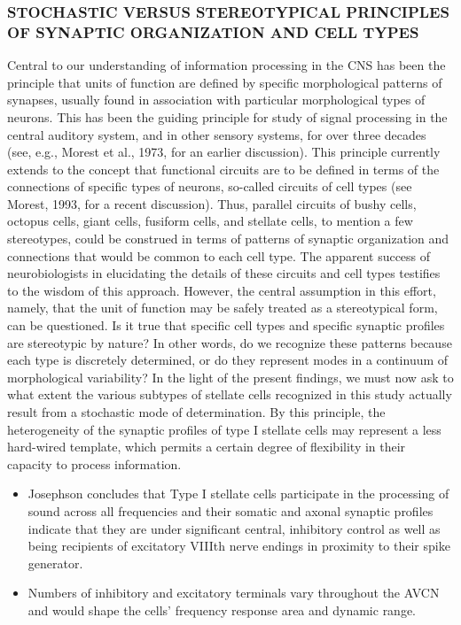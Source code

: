 \documentclass[10pt,a4paper]{article}
\begin{document}
\subsubsection{STOCHASTIC VERSUS STEREOTYPICAL PRINCIPLES OF
SYNAPTIC ORGANIZATION AND CELL TYPES}

Central to our understanding of information processing in the CNS has been the
principle that units of function are defined by specific morphological patterns
of synapses, usually found in association with particular morphological types of
neurons. This has been the guiding principle for study of signal processing in
the central auditory system, and in other sensory systems, for over three
decades (see, e.g., Morest et al., 1973, for an earlier discussion). This
principle currently extends to the concept that functional circuits are to be
defined in terms of the connections of specific types of neurons, so-called
circuits of cell types (see Morest, 1993, for a recent discussion). Thus,
parallel circuits of bushy cells, octopus cells, giant cells, fusiform cells,
and stellate cells, to mention a few stereotypes, could be construed in terms of
patterns of synaptic organization and connections that would be common to each
cell type.  The apparent success of neurobiologists in elucidating the details
of these circuits and cell types testifies to the wisdom of this approach.
However, the central assumption in this effort, namely, that the unit of
function may be safely treated as a stereotypical form, can be questioned. Is it
true that specific cell types and specific synaptic profiles are stereotypic by
nature? In other words, do we recognize these patterns because each type is
discretely determined, or do they represent modes in a continuum of
morphological variability? In the light of the present findings, we must now ask
to what extent the various subtypes of stellate cells recognized in this study
actually result from a stochastic mode of determination. By this principle, the
heterogeneity of the synaptic profiles of type I stellate cells may represent a
less hard-wired template, which permits a certain degree of flexibility in their
capacity to process information.


\begin{itemize}
\item Josephson concludes that Type I stellate cells participate in the
  processing of sound across all frequencies and their somatic and axonal
  synaptic profiles indicate that they are under significant central, inhibitory
  control as well as being recipients of excitatory VIIIth nerve endings in
  proximity to their spike generator.
\item Numbers of inhibitory and excitatory terminals vary throughout the AVCN
  and would shape the cells{\textquoteright} frequency response area and dynamic
  range.
\end{itemize}
\end{document}
